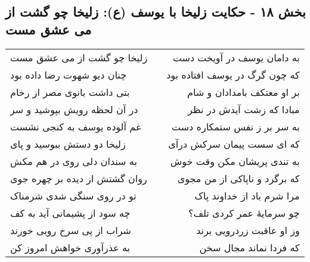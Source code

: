 \begin{center}
\section*{بخش ۱۸ - حکایت زلیخا با یوسف (ع): زلیخا چو گشت از می عشق مست}
\label{sec:018}
\begin{longtable}{l p{0.5cm} r}
زلیخا چو گشت از می عشق مست
&&
به دامان یوسف در آویخت دست
\\
چنان دیو شهوت رضا داده بود
&&
که چون گرگ در یوسف افتاده بود
\\
بتی داشت بانوی مصر از رخام
&&
بر او معتکف بامدادان و شام
\\
در آن لحظه رویش بپوشید و سر
&&
مبادا که زشت آیدش در نظر
\\
غم آلوده یوسف به کنجی نشست
&&
به سر بر ز نفس ستمکاره دست
\\
زلیخا دو دستش ببوسید و پای
&&
که ای سست پیمان سرکش درآی
\\
به سندان دلی روی در هم مکش
&&
به تندی پریشان مکن وقت خوش
\\
روان گشتش از دیده بر چهره جوی
&&
که برگرد و ناپاکی از من مجوی
\\
تو در روی سنگی شدی شرمناک
&&
مرا شرم باد از خداوند پاک
\\
چه سود از پشیمانی آید به کف
&&
چو سرمایهٔ عمر کردی تلف؟
\\
شراب از پی سرخ رویی خورند
&&
وز او عاقبت زردرویی برند
\\
به عذرآوری خواهش امروز کن
&&
که فردا نماند مجال سخن
\\
\end{longtable}
\end{center}
